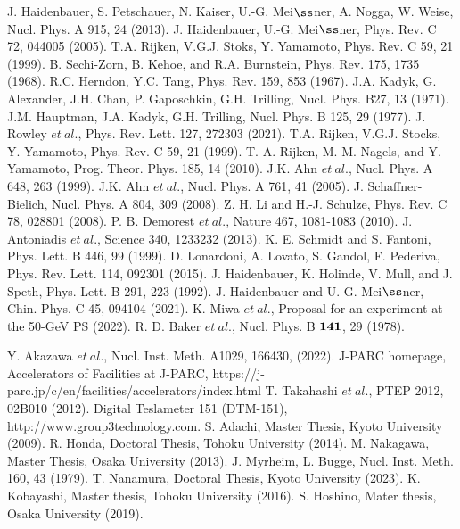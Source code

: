 \begin{thebibliography}{99}
J. Haidenbauer, S. Petschauer, N. Kaiser, U.-G. Mei$\ss$ner, A. Nogga, W. Weise, Nucl. Phys. A 915, 24 (2013).
J. Haidenbauer, U.-G. Mei$\ss$ner, Phys. Rev. C 72, 044005 (2005).
T.A. Rijken, V.G.J. Stoks, Y. Yamamoto, Phys. Rev. C 59, 21 (1999).
B. Sechi-Zorn, B. Kehoe, and R.A. Burnstein, Phys. Rev. 175, 1735 (1968).
R.C. Herndon, Y.C. Tang, Phys. Rev. 159, 853 (1967).
J.A. Kadyk, G. Alexander, J.H. Chan, P. Gaposchkin, G.H. Trilling, Nucl. Phys. B27, 13 (1971).
J.M. Hauptman, J.A. Kadyk, G.H. Trilling, Nucl. Phys. B 125, 29 (1977).
J. Rowley $et\ al.$, Phys. Rev. Lett. 127, 272303 (2021).
T.A. Rijken, V.G.J. Stocks, Y. Yamamoto, Phys. Rev. C 59, 21 (1999).
T. A. Rijken, M. M. Nagels, and Y. Yamamoto, Prog. Theor. Phys. 185, 14 (2010).
J.K. Ahn $et\ al.$, Nucl. Phys. A 648, 263 (1999).
J.K. Ahn $et\ al.$, Nucl. Phys. A 761, 41 (2005).
J. Schaffner-Bielich, Nucl. Phys. A 804, 309 (2008).
Z. H. Li and H.-J. Schulze, Phys. Rev. C 78, 028801 (2008).
P. B. Demorest $et\ al.$, Nature 467, 1081-1083 (2010).
J. Antoniadis $et\ al.$, Science 340, 1233232 (2013).
K. E. Schmidt and S. Fantoni, Phys. Lett. B 446, 99 (1999).
D. Lonardoni, A. Lovato, S. Gandol, F. Pederiva, Phys. Rev. Lett. 114, 092301 (2015).
J. Haidenbauer, K. Holinde, V. Mull, and J. Speth, Phys. Lett. B 291, 223 (1992).
J. Haidenbauer and U.-G. Mei$\ss$ner, Chin. Phys. C 45, 094104 (2021).
K. Miwa $et\ al.$, Proposal for an experiment at the 50-GeV PS (2022).
R. D. Baker $et\ al.$, Nucl. Phys. B $\bf{141}$, 29 (1978).


Y. Akazawa $et\ al.$, Nucl. Inst. Meth. A1029, 166430, (2022).
J-PARC homepage, Accelerators of Facilities at J-PARC, https://j-parc.jp/c/en/facilities/accelerators/index.html
T. Takahashi $et\ al.$, PTEP 2012, 02B010 (2012).
Digital Teslameter 151 (DTM-151), http://www.group3technology.com.
S. Adachi, Master Thesis, Kyoto University (2009).
R. Honda, Doctoral Thesis, Tohoku University (2014).
M. Nakagawa, Master Thesis, Osaka University (2013).
J. Myrheim, L. Bugge, Nucl. Inst. Meth. 160, 43 (1979).
T. Nanamura, Doctoral Thesis, Kyoto University (2023).
K. Kobayashi, Master thesis, Tohoku University (2016).
S. Hoshino, Mater thesis, Osaka University (2019).


\end{thebibliography}
